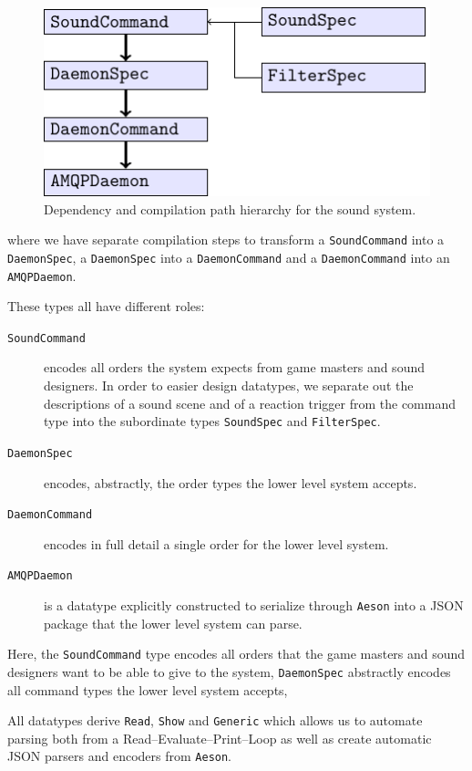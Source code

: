 \begin{figure}[H]
  \centering
  \includegraphics{figure}
  
  \caption{Dependency and compilation path hierarchy for the sound system.}
\label{fig:sshierarchy}
\end{figure}
where we have separate compilation steps to transform a \texttt{SoundCommand}
into a \texttt{DaemonSpec}, a \texttt{DaemonSpec} into a \texttt{DaemonCommand} and a
\texttt{DaemonCommand} into an \texttt{AMQPDaemon}.

These types all have different roles:
\begin{description}
\item[\tt SoundCommand] encodes all orders the system expects from
  game masters and sound designers. In order to easier design
  datatypes, we separate out the descriptions of a sound scene and of
  a reaction trigger from the command type into the subordinate types
  \texttt{SoundSpec} and \texttt{FilterSpec}.
\item[\tt DaemonSpec] encodes, abstractly, the order types the lower
  level system accepts.
\item[\tt DaemonCommand] encodes in full detail a single order for the
  lower level system.
\item[\tt AMQPDaemon] is a datatype explicitly constructed to serialize
  through \texttt{Aeson} into a JSON package that the lower level
  system can parse.
\end{description}

Here, the \texttt{SoundCommand} type encodes all orders that the game
masters and sound designers want to be able to give to the system,
\texttt{DaemonSpec} abstractly encodes all command types the lower
level system accepts, 

All datatypes derive \texttt{Read}, \texttt{Show} and \texttt{Generic}
which allows us to automate parsing both from a Read--Evaluate--Print--Loop as well as
create automatic JSON parsers and encoders from \texttt{Aeson}. 

